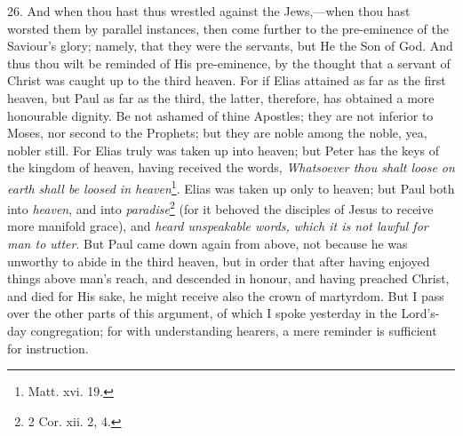 26. And when thou hast thus wrestled against the Jews,—when thou hast worsted them by parallel instances, then come further to the pre-eminence of the Saviour’s glory; namely, that they were the servants, but He the Son of God. And thus thou wilt be reminded of His pre-eminence, by the thought that a servant of Christ was caught up to the third heaven. For if Elias attained as far as the first heaven, but Paul as far as the third, the latter, therefore, has obtained a more honourable dignity. Be not ashamed of thine Apostles; they are not inferior to Moses, nor second to the Prophets; but they are noble among the noble, yea, nobler still. For Elias truly was taken up into heaven; but Peter has the keys of the kingdom of heaven, having received the words, \emph{Whatsoever thou shalt loose on earth shall be loosed in heaven}\footnote{Matt. xvi. 19.}. Elias was taken up only to heaven; but Paul both into \emph{heaven}, and into \emph{paradise}\footnote{2 Cor. xii. 2, 4.} (for it behoved the disciples of Jesus to receive more manifold grace), and \emph{heard unspeakable words, which it is not lawful for man to utter}. But Paul came down again from above, not because he was unworthy to abide in the third heaven, but in order that after having enjoyed things above man’s reach, and descended in honour, and having preached Christ, and died for His sake, he might receive also the crown of martyrdom. But I pass over the other parts of this argument, of which I spoke yesterday in the Lord’s-day congregation; for with understanding hearers, a mere reminder is sufficient for instruction.

